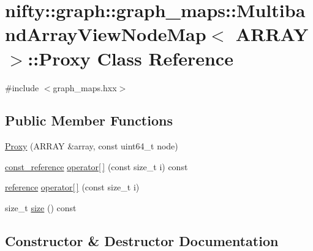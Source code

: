 \hypertarget{classnifty_1_1graph_1_1graph__maps_1_1MultibandArrayViewNodeMap_1_1Proxy}{}\section{nifty\+:\+:graph\+:\+:graph\+\_\+maps\+:\+:Multiband\+Array\+View\+Node\+Map$<$ A\+R\+R\+A\+Y $>$\+:\+:Proxy Class Reference}
\label{classnifty_1_1graph_1_1graph__maps_1_1MultibandArrayViewNodeMap_1_1Proxy}


{\ttfamily \#include $<$graph\+\_\+maps.\+hxx$>$}

\subsection*{Public Member Functions}
\begin{DoxyCompactItemize}
\item 
\hyperlink{classnifty_1_1graph_1_1graph__maps_1_1MultibandArrayViewNodeMap_1_1Proxy_af71365cdbc48a7443712589e08b29f92}{Proxy} (A\+R\+R\+A\+Y \&array, const uint64\+\_\+t node)
\item 
\hyperlink{structnifty_1_1graph_1_1graph__maps_1_1MultibandArrayViewNodeMap_a9a4da5d4bb0e9439af359184b91bc65b}{const\+\_\+reference} \hyperlink{classnifty_1_1graph_1_1graph__maps_1_1MultibandArrayViewNodeMap_1_1Proxy_a4a396858dec551ac863a532eaf35a90a}{operator\mbox{[}$\,$\mbox{]}} (const size\+\_\+t i) const 
\item 
\hyperlink{structnifty_1_1graph_1_1graph__maps_1_1MultibandArrayViewNodeMap_ae8a745152ddc0f45748a17dc130403f6}{reference} \hyperlink{classnifty_1_1graph_1_1graph__maps_1_1MultibandArrayViewNodeMap_1_1Proxy_a38bae30fe7f27638ef27fc7dddb2a7da}{operator\mbox{[}$\,$\mbox{]}} (const size\+\_\+t i)
\item 
size\+\_\+t \hyperlink{classnifty_1_1graph_1_1graph__maps_1_1MultibandArrayViewNodeMap_1_1Proxy_a24fa21b8bf2080c6c5f57de1db0b5522}{size} () const 
\end{DoxyCompactItemize}


\subsection{Constructor \& Destructor Documentation}
\hypertarget{classnifty_1_1graph_1_1graph__maps_1_1MultibandArrayViewNodeMap_1_1Proxy_af71365cdbc48a7443712589e08b29f92}{}
